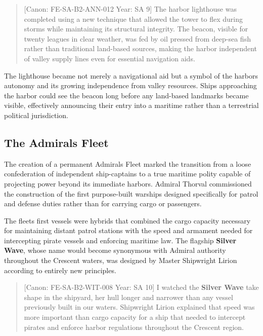 \begin{quote}
{[}Canon: FE-SA-B2-ANN-012 \textbar{} Year: SA 9{]} The harbor
lighthouse was completed using a new technique that allowed the tower to
flex during storms while maintaining its structural integrity. The
beacon, visible for twenty leagues in clear weather, was fed by oil
pressed from deep-sea fish rather than traditional land-based sources,
making the harbor independent of valley supply lines even for essential
navigation aids.
\end{quote}

The lighthouse became not merely a navigational aid but a symbol of the
harbor\textquotesingle s autonomy and its growing independence from
valley resources. Ships approaching the harbor could see the beacon long
before any land-based landmarks became visible, effectively announcing
their entry into a maritime rather than a terrestrial political
jurisdiction.

\subsection{The Admiral\textquotesingle s
Fleet}\label{the-admirals-fleet}

The creation of a permanent Admiral\textquotesingle s Fleet marked the
transition from a loose confederation of independent ship-captains to a
true maritime polity capable of projecting power beyond its immediate
harbors. Admiral Thorval commissioned the construction of the first
purpose-built warships designed specifically for patrol and defense
duties rather than for carrying cargo or passengers.

The fleet\textquotesingle s first vessels were hybrids that combined the
cargo capacity necessary for maintaining distant patrol stations with
the speed and armament needed for intercepting pirate vessels and
enforcing maritime law. The flagship \textbf{Silver Wave}, whose name
would become synonymous with Admiral authority throughout the Crescent
waters, was designed by Master Shipwright Lirion according to entirely
new principles.

\begin{quote}
{[}Canon: FE-SA-B2-WIT-008 \textbar{} Year: SA 10{]} I watched the
\textbf{Silver Wave} take shape in the shipyard, her hull longer and
narrower than any vessel previously built in our waters. Shipwright
Lirion explained that speed was more important than cargo capacity for a
ship that needed to intercept pirates and enforce harbor regulations
throughout the Crescent region.
\end{quote}

